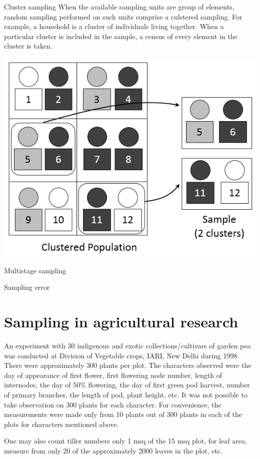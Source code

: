 \documentclass[
  ignorenonframetext,
  aspectratio=169]{beamer}
\begin{document}
\begin{frame}{Cluster sampling}
\protect\hypertarget{cluster-sampling}{}
When the available sampling units are group of elements, random sampling
performed on such units comprise a culstered sampling. For example, a
household is a cluster of individuals living together. When a particular
cluster is included in the sample, a census of every element in the
cluster is taken.

\begin{center}\includegraphics[width=0.48\linewidth]{./images/cluster_sampling} \end{center}
\end{frame}

\begin{frame}{Multistage sampling}
\protect\hypertarget{multistage-sampling}{}
\end{frame}

\begin{frame}{Sampling error}
\protect\hypertarget{sampling-error}{}
\end{frame}

\hypertarget{sampling-in-agricultural-research}{%
\section{Sampling in agricultural
research}\label{sampling-in-agricultural-research}}

\begin{frame}{}
\protect\hypertarget{section-8}{}
An experiment with 30 indigenous and exotic collections/cultivars of
garden pea was conducted at Division of Vegetable crops, IARI, New Delhi
during 1998. There were approximately 300 plants per plot. The
characters observed were the day of appearance of first flower, first
flowering node number, length of internodes, the day of 50\% flowering,
the day of first green pod harvest, number of primary branches, the
length of pod, plant height, etc. It was not possible to take
observation on 300 plants for each character. For convenience, the
measurements were made only from 10 plants out of 300 plants in each of
the plots for characters mentioned above.

One may also count tiller numbers only 1 msq of the 15 msq plot, for
leaf area, measure from only 20 of the approximately 2000 leaves in the
plot, etc.
\end{frame}
\end{document}
